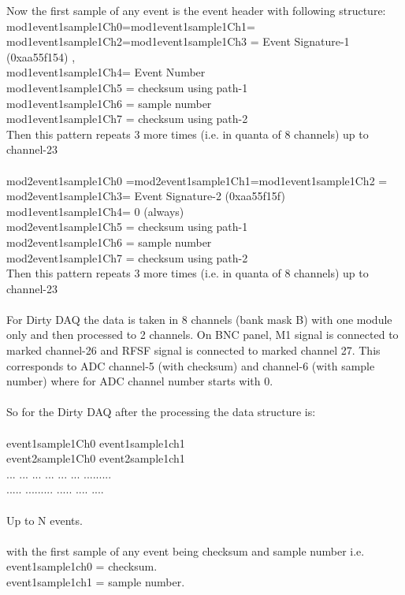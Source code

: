 \documentclass[12pt]{article}
\begin{document}
Now the first sample of any event is the event header with following structure:\\
mod1event1sample1Ch0=mod1event1sample1Ch1=\\
mod1event1sample1Ch2=mod1event1sample1Ch3 = Event Signature-1 (0xaa55f154) ,\\ mod1event1sample1Ch4= Event Number\\
mod1event1sample1Ch5 = checksum using path-1  \\mod1event1sample1Ch6 = sample number \\mod1event1sample1Ch7 = checksum using path-2 \\
Then this pattern repeats 3 more times (i.e. in quanta of 8 channels) up to channel-23\\
\\
mod2event1sample1Ch0 =mod2event1sample1Ch1=mod1event1sample1Ch2 = mod2event1sample1Ch3= Event Signature-2 (0xaa55f15f) \\mod1event1sample1Ch4= 0 (always)\\
mod2event1sample1Ch5 = checksum using path-1 \\ mod2event1sample1Ch6 = sample number \\mod2event1sample1Ch7 = checksum using path-2 \\
Then this pattern repeats 3 more times (i.e. in quanta of 8 channels) up to channel-23\\
\\
For Dirty DAQ the data is taken in 8 channels (bank mask B) with one module only and then processed to 2 channels.
On BNC panel, M1 signal is connected to marked channel-26 and RFSF signal is connected to marked channel 27. This corresponds to 
ADC channel-5 (with checksum) and channel-6 (with sample number) where for ADC channel number starts with 0.\\
\\
So for the Dirty DAQ after the processing the data structure is:\\
\\
event1sample1Ch0   event1sample1ch1\\
event2sample1Ch0   event2sample1ch1\\
... ... ... ... ... ... .........\\
.....  .........  ..... .... ....\\
\\
Up to N events.\\
\\
with the first sample of any event being checksum and sample number i.e.\\
     event1sample1ch0 = checksum.\\
     event1sample1ch1 = sample number.\\
\end{document}
